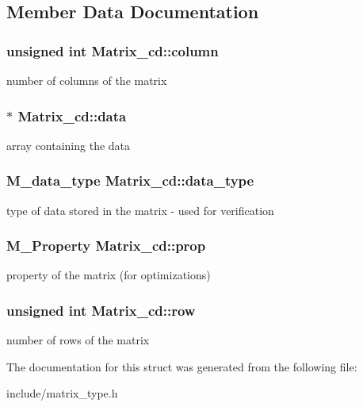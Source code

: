 \subsection{Member Data Documentation}
\subsubsection[{\texorpdfstring{column}{column}}]{\setlength{\rightskip}{0pt plus 5cm}unsigned int Matrix\+\_\+cd\+::column}\hypertarget{structMatrix__cd_a4b92706967cff4acd04999c4fc2ba8d6}{}\label{structMatrix__cd_a4b92706967cff4acd04999c4fc2ba8d6}
number of columns of the matrix 
\subsubsection[{\texorpdfstring{data}{data}}]{$\ast$ Matrix\+\_\+cd\+::data}\hypertarget{structMatrix__cd_ad754acb46b524029b61d1894c65aeace}{}\label{structMatrix__cd_ad754acb46b524029b61d1894c65aeace}
array containing the data 
\subsubsection[{\texorpdfstring{data\+\_\+type}{data_type}}]{\setlength{\rightskip}{0pt plus 5cm}M\+\_\+data\+\_\+type Matrix\+\_\+cd\+::data\+\_\+type}\hypertarget{structMatrix__cd_a258625d86cd44986cb352e84b7d5509d}{}\label{structMatrix__cd_a258625d86cd44986cb352e84b7d5509d}
type of data stored in the matrix -\/ used for verification 
\subsubsection[{\texorpdfstring{prop}{prop}}]{\setlength{\rightskip}{0pt plus 5cm}M\+\_\+\+Property Matrix\+\_\+cd\+::prop}\hypertarget{structMatrix__cd_a346b2397657fec70767d3bbdd210a129}{}\label{structMatrix__cd_a346b2397657fec70767d3bbdd210a129}
property of the matrix (for optimizations) 
\subsubsection[{\texorpdfstring{row}{row}}]{\setlength{\rightskip}{0pt plus 5cm}unsigned int Matrix\+\_\+cd\+::row}\hypertarget{structMatrix__cd_a327b0893124ef84c447dcb9d08d14403}{}\label{structMatrix__cd_a327b0893124ef84c447dcb9d08d14403}
number of rows of the matrix 

The documentation for this struct was generated from the following file\+:\begin{DoxyCompactItemize}
\item 
include/matrix\+\_\+type.\+h\end{DoxyCompactItemize}
